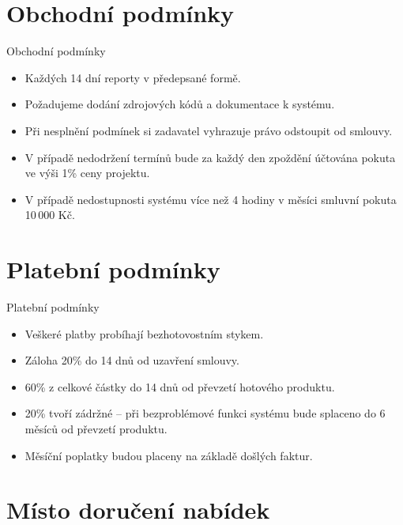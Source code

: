 \documentclass[10pt,hyperref={unicode=true}]{beamer}
\begin{document}
\section{Obchodní podmínky}

\begin{frame}{Obchodní podmínky} 
		\begin{itemize}
			\item Každých 14 dní reporty v předepsané formě.
			\item Požadujeme dodání zdrojových kódů a dokumentace k systému.
      \item Při nesplnění podmínek si zadavatel vyhrazuje právo odstoupit od smlouvy.
      \item V případě nedodržení termínů bude za každý den zpoždění účtována pokuta ve výši 1\% ceny projektu.
      \item V případě nedostupnosti systému více než 4 hodiny v měsíci smluvní pokuta 10\,000 Kč.
		\end{itemize}
\end{frame}

\section{Platební podmínky}

\begin{frame}{Platební podmínky} 
		\begin{itemize}
			\item Veškeré platby probíhají bezhotovostním stykem.
			\item Záloha 20\% do 14 dnů od uzavření smlouvy.
      \item 60\% z celkové částky do 14 dnů od převzetí hotového produktu.
      \item 20\% tvoří zádržné – při bezproblémové funkci systému bude splaceno do 6 měsíců od převzetí produktu.
      \item Měsíční poplatky budou placeny na základě došlých faktur.
		\end{itemize}
\end{frame}

\section{Místo doručení nabídek}
\end{document}
